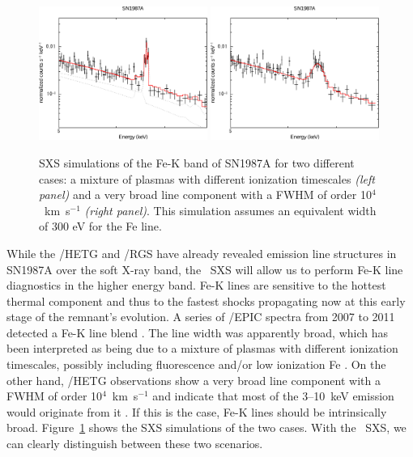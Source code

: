 \documentclass[11pt,a4paper]{article}
\begin{document}
{\begin{figure}[h]
 \centering \includegraphics[width=0.49\textwidth]{2pshock}
 \includegraphics[width=0.49\textwidth]{1pshock} 
%
   \caption[]{SXS simulations of the Fe-K band of SN1987A for two
     different cases: a mixture of plasmas with different ionization
     timescales {\it (left panel)} and a very broad line component
     with a FWHM of order 10$^{4}$~km~s$^{-1}$ {\it (right panel)}.
     This simulation assumes an equivalent width of 300 eV for the Fe
     line.}
%
 \label{fig:87a}
\end{figure}


While the \chandra/HETG and \xmm/RGS have already revealed emission
line structures in SN1987A over the soft X-ray band, the \ah\ SXS will
allow us to perform Fe-K line diagnostics in the higher energy
band. Fe-K lines are sensitive to the hottest thermal component and
thus to the fastest shocks propagating now at this early stage of the
remnant's evolution. A series of \xmm/EPIC spectra from 2007 to 2011
detected a Fe-K line blend \citep{maggi12}. The line width was
apparently broad, which has been interpreted as being due to a mixture
of plasmas with different ionization timescales, possibly including
fluorescence and/or low ionization Fe \citep{maggi12}. On the other
hand, \chandra/HETG observations show a very broad line component with
a FWHM of order 10$^{4}$~km~s$^{-1}$ and indicate that most of the
3--10~keV emission would originate from it \citep{dewey12}. If this is
the case, Fe-K lines should be intrinsically broad.
Figure~\ref{fig:87a} shows the SXS simulations of the two cases. With
the \ah\ SXS, we can clearly distinguish between these two scenarios.


}
\end{document}
